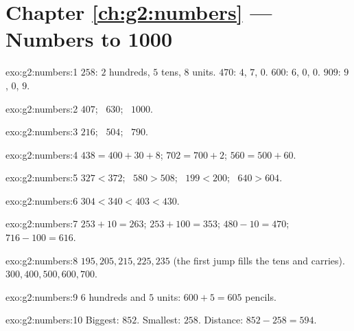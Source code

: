 \section*{Chapter \ref{ch:g2:numbers} --- Numbers to 1000}

\begin{solution}{exo:g2:numbers:1}
$258$: $2$ hundreds, $5$ tens, $8$ units. $470$: $4$, $7$, $0$.
$600$: $6$, $0$, $0$. $909$: $9$, $0$, $9$.
\end{solution}

\begin{solution}{exo:g2:numbers:2}
$407$; \ $630$; \ $1000$.
\end{solution}

\begin{solution}{exo:g2:numbers:3}
$216$; \ $504$; \ $790$.
\end{solution}

\begin{solution}{exo:g2:numbers:4}
$438 = 400 + 30 + 8$; \quad $702 = 700 + 2$; \quad
$560 = 500 + 60$.
\end{solution}

\begin{solution}{exo:g2:numbers:5}
$327 < 372$; \ $580 > 508$; \ $199 < 200$; \ $640 > 604$.
\end{solution}

\begin{solution}{exo:g2:numbers:6}
$304 < 340 < 403 < 430$.
\end{solution}

\begin{solution}{exo:g2:numbers:7}
$253 + 10 = 263$; \quad $253 + 100 = 353$; \quad
$480 - 10 = 470$; \quad $716 - 100 = 616$.
\end{solution}

\begin{solution}{exo:g2:numbers:8}
$195, 205, 215, 225, 235$ (the first jump fills the tens and
carries). $300, 400, 500, 600, 700$.
\end{solution}

\begin{solution}{exo:g2:numbers:9}
$6$ hundreds and $5$ units: $600 + 5 = 605$ pencils.
\end{solution}

\begin{solution}{exo:g2:numbers:10}
Biggest: $852$. Smallest: $258$. Distance:
$852 - 258 = 594$.
\end{solution}
